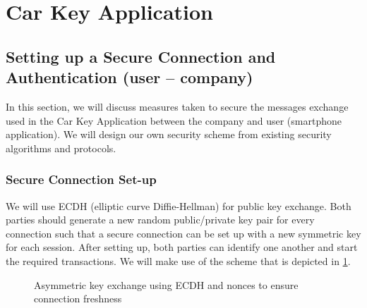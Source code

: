\section{Car Key Application}

\subsection{Setting up a Secure Connection and Authentication (user -- company)}

In this section, we will discuss measures taken to secure the messages exchange used in the Car Key Application between the company and user (smartphone application). We will design our own security scheme from existing security algorithms and protocols. %

\subsubsection{Secure Connection Set-up\label{SecureConnectionSetUp}}

We will use ECDH (elliptic curve Diffie-Hellman) for public key exchange. Both parties should generate a new random public/private key pair for every connection such that a secure connection can be set up with a new symmetric key for each session. After setting up, both parties can identify one another and start the required transactions. We will make use of the scheme that is depicted in \cref{AsymKeyExchange}.


\begin{figure}[!ht]
  \renewcommand{\Bx}{8}
  \setcounter{CC}{0}
  \centering
  \caption{Asymmetric key exchange using ECDH and nonces to ensure connection freshness}
  \label{AsymKeyExchange}
\end{figure}

